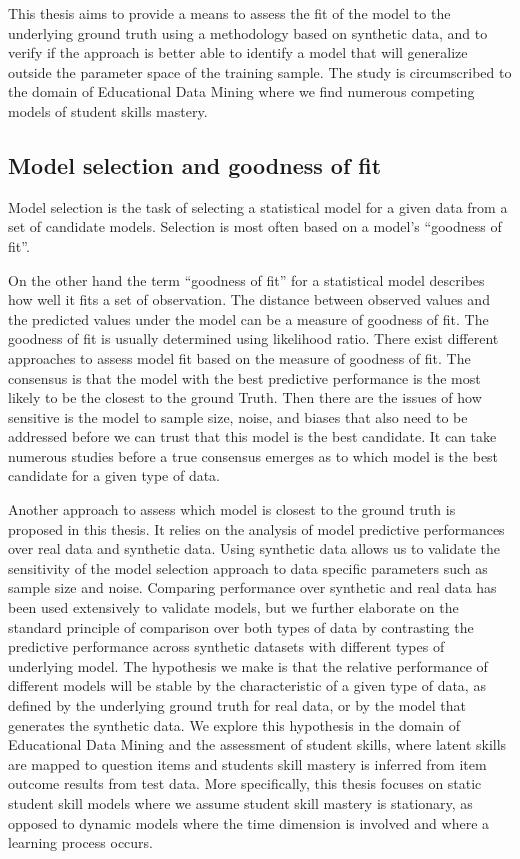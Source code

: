 This thesis aims to provide a means to assess the fit of the model to the underlying ground truth using a methodology based on synthetic data, and to verify if the approach is better able to identify a model that will generalize outside the parameter space of the training sample. The study is circumscribed to the domain of Educational Data Mining where we find numerous competing models of student skills mastery.

\subsection{Model selection and goodness of fit}

Model selection is the task of selecting a statistical model for a given data from a set of candidate models. Selection is most often based on a model's ``goodness of fit''.

On the other hand the term ``goodness of fit'' for a statistical model describes how well it fits a set of observation. The distance between observed values and the predicted values under the model can be a measure of goodness of fit. The goodness of fit is usually determined using likelihood ratio. There exist different approaches to assess model fit based on the measure of goodness of fit. The consensus is that the model with the best predictive performance is the most likely to be the closest to the ground Truth. Then there are the issues of how sensitive is the model to sample size, noise, and biases that also need to be addressed before we can trust that this model is the best candidate. It can take numerous studies before a true consensus emerges as to which model is the best candidate for a given type of data.

Another approach to assess which model is closest to the ground truth is proposed in this thesis. It relies on the analysis of model predictive performances over real data and synthetic data. Using synthetic data allows us to validate the sensitivity of the model selection approach to data specific parameters such as sample size and noise. Comparing performance over synthetic and real data has been used extensively to validate models, but we further elaborate on the standard principle of comparison over both types of data by contrasting the predictive performance across synthetic datasets with different types of underlying model. The hypothesis we make is that the relative performance of different models will be stable by the characteristic of a given type of data, as defined by the underlying ground truth for real data, or by the model that generates the synthetic data. We explore this hypothesis in the domain of Educational Data Mining and the assessment of student skills, where latent skills are mapped to question items and students skill mastery is inferred from item outcome results from test data. More specifically, this thesis focuses on static student skill models where we assume student skill mastery is stationary, as opposed to dynamic models where the time dimension is involved and where a learning process occurs.

